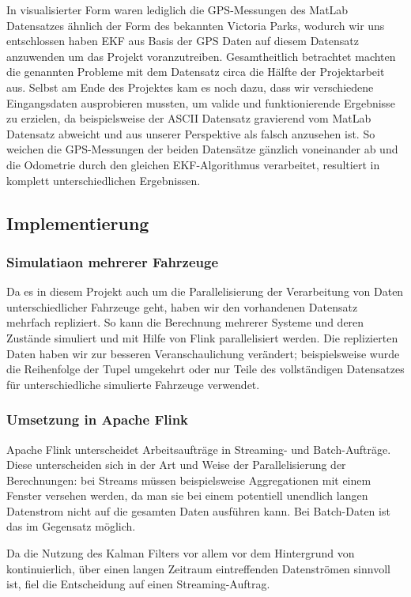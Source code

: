 \documentclass[11pt]{article}
\begin{document}
In visualisierter Form waren lediglich die GPS-Messungen des MatLab Datensatzes ähnlich der Form des bekannten Victoria Parks, wodurch wir uns entschlossen haben EKF aus Basis der GPS Daten auf diesem Datensatz anzuwenden um das Projekt voranzutreiben.
Gesamtheitlich betrachtet machten die genannten Probleme mit dem Datensatz circa die Hälfte der Projektarbeit aus. Selbst am Ende des Projektes kam es noch dazu, dass wir verschiedene Eingangsdaten ausprobieren mussten, um valide und funktionierende Ergebnisse zu erzielen, da beispielsweise der ASCII Datensatz gravierend vom MatLab Datensatz abweicht und aus unserer Perspektive als falsch anzusehen ist. So weichen die GPS-Messungen der beiden Datensätze gänzlich voneinander ab und die Odometrie durch den gleichen EKF-Algorithmus verarbeitet, resultiert in komplett unterschiedlichen Ergebnissen.

\subsection{Implementierung}

\subsubsection{Simulatiaon mehrerer Fahrzeuge}
Da es in diesem Projekt auch um die Parallelisierung der Verarbeitung von Daten unterschiedlicher Fahrzeuge geht, haben wir den vorhandenen Datensatz mehrfach repliziert. So kann die Berechnung mehrerer Systeme und deren Zustände simuliert und mit Hilfe von Flink parallelisiert werden. Die replizierten Daten haben wir zur besseren Veranschaulichung verändert; beispielsweise wurde die Reihenfolge der Tupel umgekehrt oder nur Teile des vollständigen Datensatzes für unterschiedliche simulierte Fahrzeuge verwendet.

\subsubsection{Umsetzung in Apache Flink}
Apache Flink unterscheidet Arbeitsaufträge in Streaming- und Batch-Auf\-trä\-ge. Diese unterscheiden sich in der Art und Weise der Parallelisierung der Berechnungen: bei Streams müssen beispielsweise Aggregationen mit einem Fenster versehen werden, da man sie bei einem potentiell unendlich langen Datenstrom nicht auf die gesamten Daten ausführen kann. Bei Batch-Daten ist das im Gegensatz möglich.

Da die Nutzung des Kalman Filters vor allem vor dem Hintergrund von kontinuierlich, über einen langen Zeitraum eintreffenden Datenströmen sinnvoll ist, fiel die Entscheidung auf einen Streaming-Auftrag.
\end{document}
